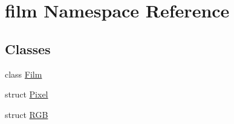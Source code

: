 \hypertarget{namespacefilm}{}\section{film Namespace Reference}
\label{namespacefilm}
\subsection*{Classes}
\begin{DoxyCompactItemize}
\item 
class \mbox{\hyperlink{classfilm_1_1Film}{Film}}
\item 
struct \mbox{\hyperlink{structfilm_1_1Pixel}{Pixel}}
\item 
struct \mbox{\hyperlink{structfilm_1_1RGB}{R\+GB}}
\end{DoxyCompactItemize}
